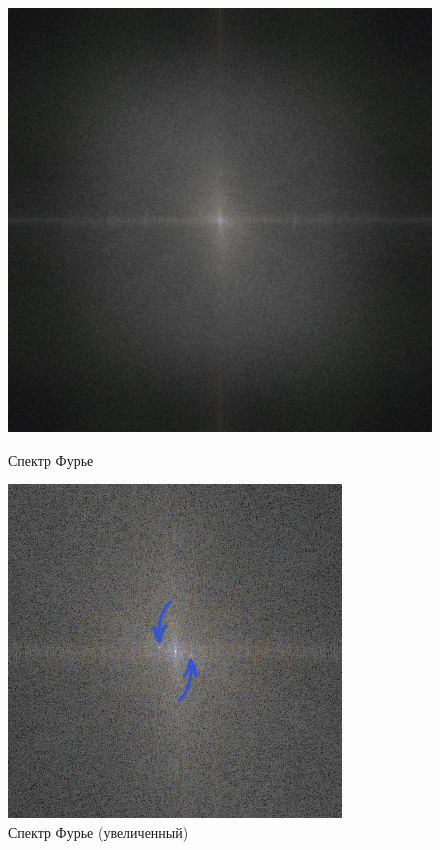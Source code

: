 \documentclass[a4paper]{article}
\begin{document}
\begin{figure}[H]
    \hspace{5em}
    \begin{minipage}{0.35\textwidth}
        \includegraphics[width=\textwidth]{sources/1first/11_fft.png}
        \caption{Спектр Фурье}
    \end{minipage}\hfill
    \begin{minipage}{0.35\textwidth}
        \includegraphics[width=\textwidth]{sources/1first/11_fft (scaled).png}
        \caption{Спектр Фурье (увеличенный)}
    \end{minipage}
    \hspace{5em}
\end{figure}
\end{document}
